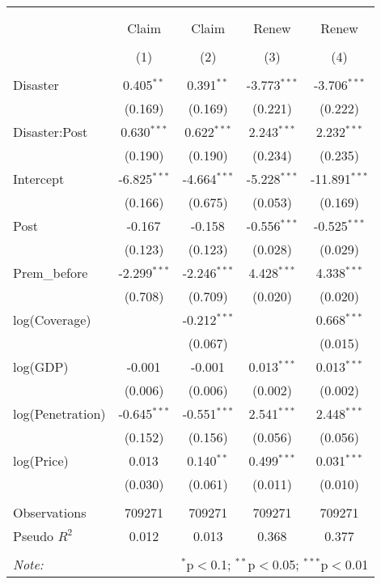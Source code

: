 
\begin{tabular}{@{\extracolsep{5pt}}lcccc}
\\[-1.8ex]\hline
\hline \\[-1.8ex]
\\[-1.8ex] & \multicolumn{1}{c}{Claim} & \multicolumn{1}{c}{Claim} & \multicolumn{1}{c}{Renew} & \multicolumn{1}{c}{Renew}  \\
\\[-1.8ex] & (1) & (2) & (3) & (4) \\
\hline \\[-1.8ex]
 Disaster & 0.405$^{**}$ & 0.391$^{**}$ & -3.773$^{***}$ & -3.706$^{***}$ \\
& (0.169) & (0.169) & (0.221) & (0.222) \\
 Disaster:Post & 0.630$^{***}$ & 0.622$^{***}$ & 2.243$^{***}$ & 2.232$^{***}$ \\
& (0.190) & (0.190) & (0.234) & (0.235) \\
 Intercept & -6.825$^{***}$ & -4.664$^{***}$ & -5.228$^{***}$ & -11.891$^{***}$ \\
& (0.166) & (0.675) & (0.053) & (0.169) \\
 Post & -0.167$^{}$ & -0.158$^{}$ & -0.556$^{***}$ & -0.525$^{***}$ \\
& (0.123) & (0.123) & (0.028) & (0.029) \\
 Prem\_before & -2.299$^{***}$ & -2.246$^{***}$ & 4.428$^{***}$ & 4.338$^{***}$ \\
& (0.708) & (0.709) & (0.020) & (0.020) \\
 log(Coverage) & & -0.212$^{***}$ & & 0.668$^{***}$ \\
& & (0.067) & & (0.015) \\
 log(GDP) & -0.001$^{}$ & -0.001$^{}$ & 0.013$^{***}$ & 0.013$^{***}$ \\
& (0.006) & (0.006) & (0.002) & (0.002) \\
 log(Penetration) & -0.645$^{***}$ & -0.551$^{***}$ & 2.541$^{***}$ & 2.448$^{***}$ \\
& (0.152) & (0.156) & (0.056) & (0.056) \\
 log(Price) & 0.013$^{}$ & 0.140$^{**}$ & 0.499$^{***}$ & 0.031$^{***}$ \\
& (0.030) & (0.061) & (0.011) & (0.010) \\
\hline \\[-1.8ex]
 Observations & 709271 & 709271 & 709271 & 709271 \\
 Pseudo $R^2$ & 0.012 & 0.013 & 0.368 & 0.377 \\
\hline
\hline \\[-1.8ex]
\textit{Note:} & \multicolumn{4}{r}{$^{*}$p$<$0.1; $^{**}$p$<$0.05; $^{***}$p$<$0.01} \\
\end{tabular}
